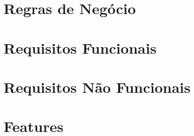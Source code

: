 \documentclass[dvips,ruledheader]{abnt}
\author{Álvaro Vilobaldo \emph{Rios}\\
Marcio \emph{Fernandes} Justino}
\begin{document}

%



\tableofcontents

\part{Regras de Negócio}












\part{Requisitos Funcionais}





\part{Requisitos Não Funcionais}


\part{Features}


% 
% 
\end{document}
